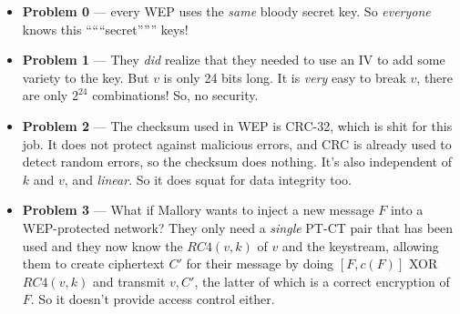 \documentclass{article}
\begin{document}
\begin{itemize}
\begin{itemize}
            \item \textbf{Problem 0} --- every WEP uses the \emph{same} bloody secret key.  So \emph{everyone} knows this ``````secret'''''' keys!
            \item \textbf{Problem 1} --- They \emph{did} realize that they needed to use an IV to add some variety to the key.  But $v$ is only 24 bits long.  It is \emph{very} easy to break $v$, there are only $2^{24}$ combinations!  So, no security.
            \item \textbf{Problem 2} --- The checksum used in WEP is CRC-32, which is shit for this job.  It does not protect against malicious errors, and CRC is already used to detect random errors, so the checksum does nothing.  It's also independent of $k$ and $v$, and \emph{linear}.  So it does squat for data integrity too.
        \item \textbf{Problem 3} --- What if Mallory wants to inject a new message $F$ into a WEP-protected network?  They only need a \emph{single} PT-CT pair that has been used and they now know the $RC4(v, k)$ of $v$ and the keystream, allowing them to create ciphertext $C'$ for their message by doing $[F, c(F)]$ XOR $RC4(v, k)$ and transmit $v, C'$, the latter of which is a correct encryption of $F$.  So it doesn't provide access control either.


\end{itemize}
\end{itemize}
\end{document}
